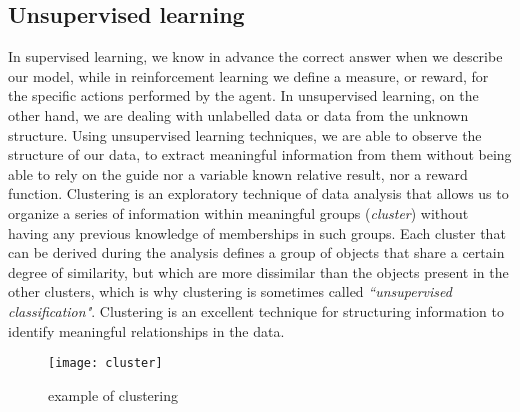 \subsection{Unsupervised learning}
\label{subsec:unsupervised-learning}
In supervised learning, we know in advance the correct answer when we describe
our model, while in reinforcement learning we define a measure, or reward, for
the specific actions performed by the agent.
In unsupervised learning, on the other hand, we are dealing with unlabelled data
or data from the unknown structure.
Using unsupervised learning techniques, we are able to observe the structure of
our data, to extract meaningful information from them without being able to
rely on the guide nor a variable known relative result, nor a reward function.
Clustering is an exploratory technique of data analysis that allows us to
organize a series of information within meaningful groups (\emph{cluster})
without having any previous knowledge of memberships in such groups.
Each cluster that can be derived during the analysis defines a group of objects
that share a certain degree of similarity, but which are more dissimilar than
the objects present in the other clusters, which is why clustering is sometimes
called \emph{``unsupervised classification"}.
Clustering is an excellent technique for structuring information to identify
meaningful relationships in the data.\cite{raschka2016machine}
%
\begin{figure}[!h]
\centering
\texttt{[image: cluster]}
\caption{example of clustering}
\label{fig:unsupervised-learning-scheme}
\end{figure}
%

